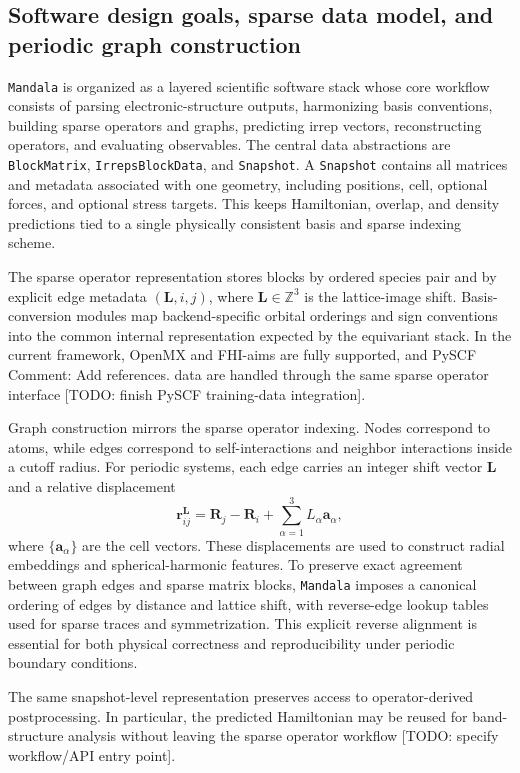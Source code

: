 \subsection{Software design goals, sparse data model, and periodic graph construction}
\label{subsec:workflow}

\texttt{Mandala} is organized as a layered scientific software stack whose core workflow
consists of parsing electronic-structure outputs, harmonizing basis
conventions, building sparse operators and graphs, predicting irrep vectors,
reconstructing operators, and evaluating observables.
The central data abstractions are \texttt{BlockMatrix},
\texttt{IrrepsBlockData}, and \texttt{Snapshot}. A \texttt{Snapshot} contains
all matrices and metadata associated with one geometry, including positions,
cell, optional forces, and optional stress targets. This keeps Hamiltonian,
overlap, and density predictions tied to a single physically consistent basis
and sparse indexing scheme.

The sparse operator representation stores blocks by ordered species pair and by
explicit edge metadata $(\bm{L},i,j)$, where $\bm{L}\in\mathbb{Z}^3$ is the
lattice-image shift. Basis-conversion modules map backend-specific orbital
orderings and sign conventions into the common internal representation expected
by the equivariant stack. In the current framework, OpenMX and FHI-aims are
fully supported, and PySCF
Comment: Add references.
data are handled through the same sparse operator
interface [TODO: finish PySCF training-data integration].

Graph construction mirrors the sparse operator indexing. Nodes correspond to
atoms, while edges correspond to self-interactions and neighbor interactions
inside a cutoff radius. For periodic systems, each edge carries an integer
shift vector $\bm{L}$ and a relative displacement
\begin{equation}
\bm{r}_{ij}^{\bm{L}}
=
\bm{R}_j - \bm{R}_i + \sum_{\alpha=1}^{3} L_{\alpha} \bm{a}_{\alpha},
\end{equation}
where $\{\bm{a}_{\alpha}\}$ are the cell vectors. These displacements are used
to construct radial embeddings and spherical-harmonic features. To preserve
exact agreement between
graph edges and sparse matrix blocks, \texttt{Mandala} imposes a canonical ordering of
edges by distance and lattice shift, with reverse-edge lookup tables used for
sparse traces and symmetrization. This explicit reverse alignment is essential
for both physical correctness and reproducibility under periodic boundary
conditions.

The same snapshot-level representation preserves access to operator-derived
postprocessing. In particular, the predicted Hamiltonian may be reused for
band-structure analysis without leaving the sparse operator workflow
[TODO: specify workflow/API entry point].
